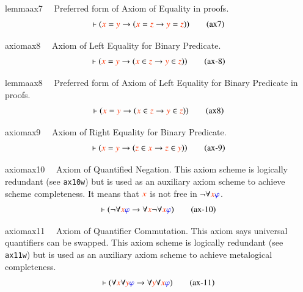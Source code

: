 \begin{restatable}{lemma}{ax7}~~ Preferred form of Axiom of Equality in proofs.
\begin{align}
\vdash ( \msc{x} = \msc{y} \rightarrow ( \msc{x} = \msc{z} \rightarrow \msc{y}
    = \msc{z} ) )\label{eq:ax7}\tag{ax7}
\end{align}
\end{restatable}

\begin{restatable}{axiom}{ax8}~~ Axiom of Left Equality for Binary Predicate. 
\begin{align}
\vdash ( \msc{x} = \msc{y} \rightarrow ( \msc{x} \in \msc{z} \rightarrow
    \msc{y} \in \msc{z} ) )\label{eq:ax-8}\tag{ax-8}
\end{align}
\end{restatable}

\begin{restatable}{lemma}{ax8}~~ Preferred form of Axiom of Left Equality for Binary Predicate in proofs.
\begin{align}
\vdash ( \msc{x} = \msc{y} \rightarrow ( \msc{x} \in \msc{z} \rightarrow
    \msc{y} \in \msc{z} ) )\label{eq:ax8}\tag{ax8}
\end{align}
\end{restatable}

\begin{restatable}{axiom}{ax9}~~ Axiom of Right Equality for Binary Predicate. 
\begin{align}
\vdash ( \msc{x} = \msc{y} \rightarrow ( \msc{z} \in \msc{x} \rightarrow
    \msc{z} \in \msc{y} ) )\label{eq:ax-9}\tag{ax-9}
\end{align}
\end{restatable}

\begin{restatable}{axiom}{ax10}~~ Axiom of Quantified Negation.   This axiom
     scheme is logically redundant (see {\tt ax10w}) but is used as an
auxiliary
     axiom scheme to achieve scheme completeness.  It means that $\msc{x}$ is
not free in $\lnot \forall \msc{x} \mw{\varphi}$.  ~
\begin{align}
\vdash ( \lnot \forall \msc{x} \mw{\varphi} \rightarrow \forall \msc{x} \lnot
    \forall \msc{x} \mw{\varphi} )\label{eq:ax-10}\tag{ax-10}
\end{align}
\end{restatable}

\begin{restatable}{axiom}{ax11}~~ Axiom of Quantifier Commutation.  This axiom
says universal quantifiers
     can be swapped.    This axiom scheme is logically redundant (see {\tt
ax11w})
     but is used as an auxiliary axiom scheme to achieve metalogical
     completeness.  ~
\begin{align}
\vdash ( \forall \msc{x} \forall \msc{y} \mw{\varphi} \rightarrow \forall
    \msc{y} \forall \msc{x} \mw{\varphi} )\label{eq:ax-11}\tag{ax-11}
\end{align}
\end{restatable}


